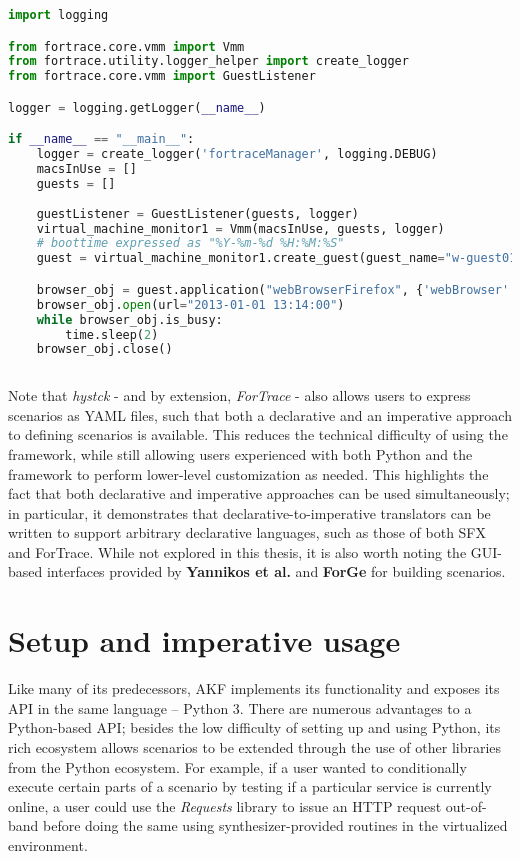 \begin{lstlisting}[language=Python]
import logging

from fortrace.core.vmm import Vmm
from fortrace.utility.logger_helper import create_logger
from fortrace.core.vmm import GuestListener

logger = logging.getLogger(__name__)

if __name__ == "__main__":
    logger = create_logger('fortraceManager', logging.DEBUG)
    macsInUse = []
    guests = []
    
    guestListener = GuestListener(guests, logger)
    virtual_machine_monitor1 = Vmm(macsInUse, guests, logger)
    # boottime expressed as "%Y-%m-%d %H:%M:%S"
    guest = virtual_machine_monitor1.create_guest(guest_name="w-guest01", platform="windows", boottime="2013-01-01 13:14:00")

    browser_obj = guest.application("webBrowserFirefox", {'webBrowser': "firefox"})
    browser_obj.open(url="2013-01-01 13:14:00")
    while browser_obj.is_busy:
        time.sleep(2)
    browser_obj.close()
    
\end{lstlisting}

Note that \emph{hystck} - and by extension, \emph{ForTrace} - also
allows users to express scenarios as YAML files, such that both a
declarative and an imperative approach to defining scenarios is
available. This reduces the technical difficulty of using the framework,
while still allowing users experienced with both Python and the
framework to perform lower-level customization as needed. This
highlights the fact that both declarative and imperative approaches can
be used simultaneously; in particular, it demonstrates that
declarative-to-imperative translators can be written to support
arbitrary declarative languages, such as those of both SFX and ForTrace.
While not explored in this thesis, it is also worth noting the GUI-based
interfaces provided by \textbf{Yannikos et al.} and \textbf{ForGe} for
building scenarios.

\section{Setup and imperative
usage}\label{setup-and-imperative-usage}

Like many of its predecessors, AKF implements its functionality and
exposes its API in the same language -- Python 3. There are numerous
advantages to a Python-based API; besides the low difficulty of setting
up and using Python, its rich ecosystem allows scenarios to be extended
through the use of other libraries from the Python ecosystem. For
example, if a user wanted to conditionally execute certain parts of a
scenario by testing if a particular service is currently online, a user
could use the \emph{Requests} library \cite{Requests31Documentation}
to issue an HTTP request out-of-band before doing the same using
synthesizer-provided routines in the virtualized environment.

